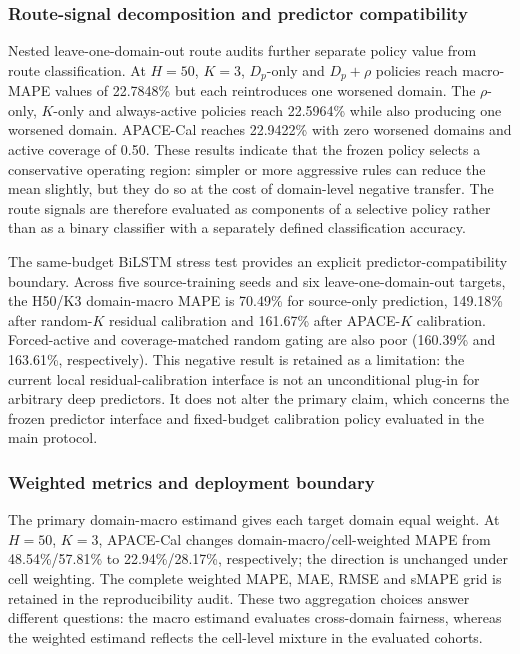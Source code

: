 \documentclass[preprint,12pt]{elsarticle}
\begin{document}
\subsubsection{Route-signal decomposition and predictor compatibility}

Nested leave-one-domain-out route audits further separate policy value from route classification. At $H=50$, $K=3$, $D_p$-only and $D_p+\rho$ policies reach macro-MAPE values of 22.7848\% but each reintroduces one worsened domain. The $\rho$-only, $K$-only and always-active policies reach 22.5964\% while also producing one worsened domain. APACE-Cal reaches 22.9422\% with zero worsened domains and active coverage of 0.50. These results indicate that the frozen policy selects a conservative operating region: simpler or more aggressive rules can reduce the mean slightly, but they do so at the cost of domain-level negative transfer. The route signals are therefore evaluated as components of a selective policy rather than as a binary classifier with a separately defined classification accuracy.

The same-budget BiLSTM stress test provides an explicit predictor-compatibility boundary. Across five source-training seeds and six leave-one-domain-out targets, the H50/K3 domain-macro MAPE is 70.49\% for source-only prediction, 149.18\% after random-$K$ residual calibration and 161.67\% after APACE-$K$ calibration. Forced-active and coverage-matched random gating are also poor (160.39\% and 163.61\%, respectively). This negative result is retained as a limitation: the current local residual-calibration interface is not an unconditional plug-in for arbitrary deep predictors. It does not alter the primary claim, which concerns the frozen predictor interface and fixed-budget calibration policy evaluated in the main protocol.

\subsubsection{Weighted metrics and deployment boundary}

The primary domain-macro estimand gives each target domain equal weight. At $H=50$, $K=3$, APACE-Cal changes domain-macro/cell-weighted MAPE from 48.54\%/57.81\% to 22.94\%/28.17\%, respectively; the direction is unchanged under cell weighting. The complete weighted MAPE, MAE, RMSE and sMAPE grid is retained in the reproducibility audit. These two aggregation choices answer different questions: the macro estimand evaluates cross-domain fairness, whereas the weighted estimand reflects the cell-level mixture in the evaluated cohorts.
\end{document}
